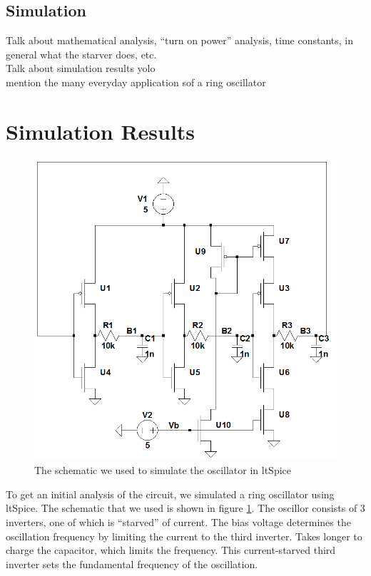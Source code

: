 \documentclass{article}
\begin{document}
\subsection*{Simulation}

Talk about mathematical analysis, ``turn on power'' analysis, time constants, in general what the starver does, etc.\\
Talk about simulation results yolo\\
mention the many everyday application sof a ring oscillator

\section*{Simulation Results}

\begin{figure}[H]
\centering
\includegraphics[scale=.5]{finalSchem2.png}
\caption{The schematic we used to simulate the oscillator in ltSpice}
\label{schem}
\end{figure}

To get an initial analysis of the circuit, we simulated a ring oscillator using ltSpice. The schematic that we used is shown in figure \ref{schem}. The oscillor consists of 3 inverters, one of which is ``starved'' of current. The bias voltage determines the oscillation frequency by limiting the current to the third inverter. Takes longer to charge the capacitor, which limits the frequency. This current-starved third inverter sets the fundamental frequency of the oscillation. \\
\end{document}
